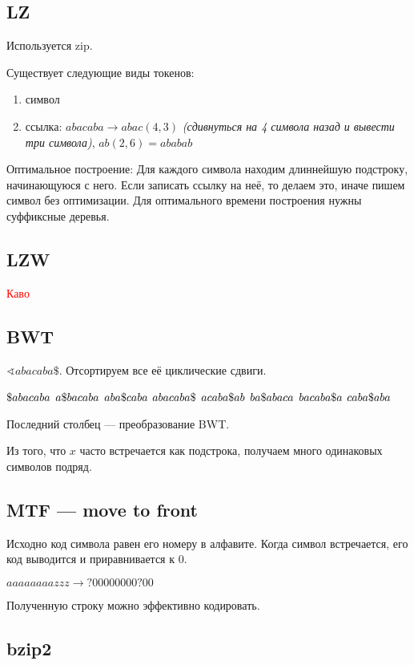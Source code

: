 \subsection{LZ}

Используется zip.

Существует следующие виды токенов:

\begin{enumerate}
    \item символ
    \item ссылка: $abacaba\to abac(4,3)$ \textit{(сдивнуться на 4 символа назад и вывести три символа)}, $ab(2,6) = ababab$
\end{enumerate}

Оптимальное построение: Для каждого символа находим длиннейшую подстроку, начинающуюся  с него. Если записать ссылку на неё, то делаем это, иначе пишем символ без оптимизации. Для оптимального времени построения нужны суффиксные деревья. 

\subsection{LZW}

\textcolor{red}{Каво}

\subsection{BWT}

$\sphericalangle abacaba\$ $. Отсортируем все её циклические сдвиги.

\noindent
$\$ abacaba\\$
$a\$ bacaba\\$
$aba\$ caba\\$
$abacaba\$ \\$
$acaba\$ ab \\$
$ba\$ abaca \\$
$bacaba\$ a \\$
$caba\$ aba \\$

Последний столбец --- преобразование BWT.

Из того, что $x$ часто встречается как подстрока, получаем много одинаковых символов подряд.

\subsection{MTF --- move to front}

Исходно код символа равен его номеру в алфавите. Когда символ встречается, его код выводится и приравнивается к 0.

$aaaaaaaazzz\to ?00000000?00$

Полученную строку можно эффективно кодировать.

\subsection{bzip2}

